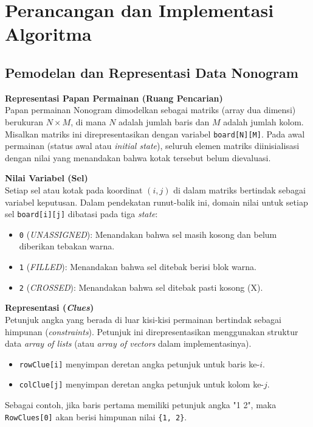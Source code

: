 \documentclass[conference]{IEEEtran}
\begin{document}
\section{Perancangan dan Implementasi Algoritma}
\subsection{Pemodelan dan Representasi Data Nonogram}
\textbf{Representasi Papan Permainan (Ruang Pencarian)} \\
Papan permainan Nonogram dimodelkan sebagai matriks (array dua dimensi) berukuran $N \times M$, di mana $N$ adalah jumlah baris dan $M$ adalah jumlah kolom. Misalkan matriks ini direpresentasikan dengan variabel \texttt{board[N][M]}. Pada awal permainan (status awal atau \textit{initial state}), seluruh elemen matriks diinisialisasi dengan nilai yang menandakan bahwa kotak tersebut belum dievaluasi.

\textbf{Nilai Variabel (Sel)} \\
Setiap sel atau kotak pada koordinat $(i, j)$ di dalam matriks bertindak sebagai variabel keputusan. Dalam pendekatan runut-balik ini, domain nilai untuk setiap sel \texttt{board[i][j]} dibatasi pada tiga \textit{state}:
\begin{itemize}
    \item \texttt{0} (\textit{UNASSIGNED}): Menandakan bahwa sel masih kosong dan belum diberikan tebakan warna.
    \item \texttt{1} (\textit{FILLED}): Menandakan bahwa sel ditebak berisi blok warna.
    \item \texttt{2} (\textit{CROSSED}): Menandakan bahwa sel ditebak pasti kosong (X).
\end{itemize}

\textbf{Representasi (\textit{Clues})} \\
Petunjuk angka yang berada di luar kisi-kisi permainan bertindak sebagai himpunan (\textit{constraints}). Petunjuk ini direpresentasikan menggunakan struktur data \textit{array of lists} (atau \textit{array of vectors} dalam implementasinya). 
\begin{itemize}
    \item \texttt{rowClue[i]} menyimpan deretan angka petunjuk untuk baris ke-$i$.
    \item \texttt{colClue[j]} menyimpan deretan angka petunjuk untuk kolom ke-$j$.
\end{itemize}
Sebagai contoh, jika baris pertama memiliki petunjuk angka "1 2", maka \texttt{RowClues[0]} akan berisi himpunan nilai \texttt{\{1, 2\}}.
\end{document}
